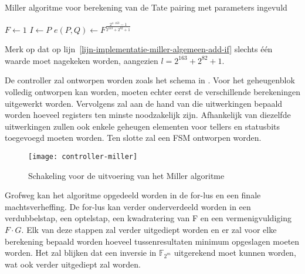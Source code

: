 \begin{algorithm}[h]
	\caption{Miller algoritme voor berekening van de Tate pairing met parameters ingevuld}
	\label{algoritme-implementatie-miller-algemeen}
	$F \leftarrow 1$\;
	$I \leftarrow P$\;
	$e(P, Q) \leftarrow F^{\frac{2^{4 \cdot 163} - 1}{2^{163} + 2^{82} + 1}}$\;
\end{algorithm}

Merk op dat op lijn~\ref{lijn-implementatie-miller-algemeen-add-if} slechts \'e\'en waarde moet nagekeken worden, aangezien $l = 2^{163} + 2^{82} + 1$.

De controller zal ontworpen worden zoals het schema in . Voor het geheugenblok volledig ontworpen kan worden, moeten echter eerst de verschillende berekeningen uitgewerkt worden. Vervolgens zal aan de hand van die uitwerkingen bepaald worden hoeveel registers ten minste noodzakelijk zijn. Afhankelijk van diezelfde uitwerkingen zullen ook enkele geheugen elementen voor tellers en statusbits toegevoegd moeten worden. Ten slotte zal een FSM ontworpen worden.

\begin{figure}[h]
	\centering
		\texttt{[image: controller-miller]}
		\caption{Schakeling voor de uitvoering van het Miller algoritme\label{figuur-implementatie-miller-controller}}
\end{figure}

Grofweg kan het algoritme opgedeeld worden in de for-lus  en een finale machtsverheffing. De for-lus kan verder onderverdeeld worden in een verdubbelstap, een optelstap, een kwadratering van F en een vermenigvuldiging $F \cdot G$. Elk van deze stappen zal verder uitgediept worden en er zal voor elke berekening bepaald worden hoeveel tussenresultaten minimum opgeslagen moeten worden. Het zal blijken dat een inversie in $\mathbb{F}_{2^m}$ uitgerekend moet kunnen worden, wat ook verder uitgediept zal worden.

